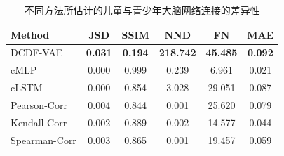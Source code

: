 \begin{table}[!htb]
\centering
\caption{DCDF-VAE 各模块的消融结果}
\label{tab:dcdf_vae_ablation}
\end{table}

\begin{table}[h]
	\caption{不同方法所估计的儿童与青少年大脑网络连接的差异性}
	\label{tab:difference}
	\centering
	\begin{tabular}{l|c|c|c|c|c}
		\hline
		Method & JSD & SSIM & NND & FN & MAE \\
		\hline
		DCDF-VAE & \textbf{0.031} & \textbf{0.194} & \textbf{218.742} & \textbf{45.485} & \textbf{0.092} \\
		cMLP & 0.000 & 0.999 & 0.239 & 6.961 & 0.021 \\
		cLSTM & 0.000 & 0.854 & 3.028 & 29.051 & 0.087 \\
		Pearson-Corr & 0.004 & 0.844 & 0.001 & 25.620 & 0.079 \\
		Kendall-Corr & 0.002 & 0.889 & 0.002 & 14.577 & 0.044 \\
		Spearman-Corr & 0.003 & 0.865 & 0.001 & 19.457 & 0.059 \\
		\hline
	\end{tabular}
\end{table}

